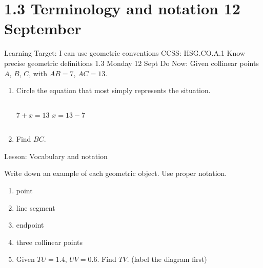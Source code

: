 \section{1.3 Terminology and notation \hfill 12 September}
\begin{frame}{Learning Target: I can use geometric conventions}
  {CCSS: HSG.CO.A.1 Know precise geometric definitions \hfill \alert{1.3 Monday 12 Sept}}
  Do Now: Given collinear points $A$, $B$, $C$, with $AB=7$, $AC=13$.
  \begin{center}
  \end{center}
  \begin{enumerate}
    \item Circle the equation that most simply represents the situation. \medskip
    \begin{columns}[c]
      \qquad \hspace{2cm} $7 + x = 13$
      $x = 13 - 7$
    \end{columns}
    \item Find $BC$.
  \end{enumerate} \vspace{2cm}
  Lesson: Vocabulary and notation
  \end{frame}

\begin{frame}{Write down an example of each geometric object.}
{Use proper notation.}
  \begin{enumerate}
    \item point
    \item line segment
    \item endpoint
    \item three collinear points
    \item Given $TU=1.4$, $UV=0.6$. Find $TV$. (label the diagram first)
  \end{enumerate}
\end{frame}

